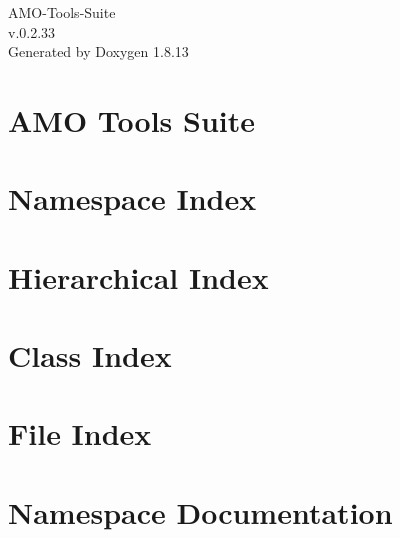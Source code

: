 \documentclass[twoside]{book}
\newcommand{\+}{\discretionary{\mbox{\scriptsize$\hookleftarrow$}}{}{}}
\newcommand{\clearemptydoublepage}{%
  \newpage{\pagestyle{empty}\cleardoublepage}%
}
\begin{document}
\hypersetup{pageanchor=false,
             bookmarksnumbered=true,
             pdfencoding=unicode
            }
\begin{titlepage}
\vspace*{7cm}
\begin{center}%
{\Large A\+M\+O-\/\+Tools-\/\+Suite \\[1ex]\large v.\+0.\+2.\+33 }\\
\vspace*{1cm}
{\large Generated by Doxygen 1.8.13}\\
\end{center}
\end{titlepage}
\clearemptydoublepage
{}
\tableofcontents
\clearemptydoublepage
{}
\hypersetup{pageanchor=true}

\chapter{A\+MO Tools Suite}
\label{index}\hypertarget{index}{}
\chapter{Namespace Index}

\chapter{Hierarchical Index}

\chapter{Class Index}

\chapter{File Index}

\chapter{Namespace Documentation}

\end{document}
